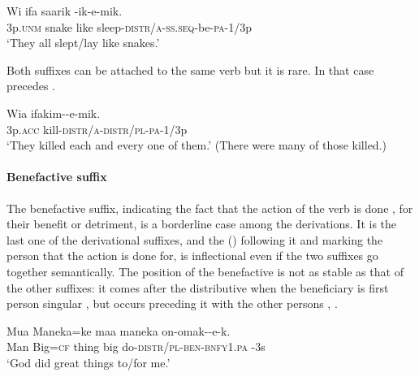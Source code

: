 \ea%
\label{ex:3:x208}
\gll Wi ifa saarik -ik-e-mik. \\
3p.\textsc{unm} snake like sleep-\textsc{distr}/\textsc{a}-\textsc{ss}.\textsc{seq}-be-\textsc{pa}-1/3p \\
\glt`They all slept/lay like snakes.'
\z

Both suffixes can be attached to the same verb but it is rare. In that case \textstyleEmphasizedVernacularWords{\nobreakdash-} precedes \textstyleEmphasizedVernacularWords{\nobreakdash-}.

\ea%
\label{ex:3:x206}
\gll Wia ifakim--e-mik. \\
3p.\textsc{acc} kill-\textsc{distr}/\textsc{a}-\textsc{distr}/\textsc{pl}-\textsc{pa}-1/3p \\
\glt`They killed each and every one of them.' (There were many of those killed.) 
\z

\paragraph{Benefactive suffix} \label{sec:3.8.2.3.3}
{}
The benefactive suffix, indicating the fact that the action of the verb is done , for their benefit or detriment, is a borderline case among the derivations. It is the last one of the derivational suffixes, and the  () following it and marking the person that the action is done for, is inflectional even if the two suffixes go together semantically. The position of the benefactive is not as stable as that of the other suffixes: it comes after the distributive when the beneficiary is first person singular ,  but occurs preceding it with the other persons , . 

\ea%
\label{ex:3:x210}
\gll Mua Maneka=ke maa maneka on-omak--e-k. \\
Man Big=\textsc{cf} thing big do-\textsc{distr}/\textsc{pl}-\textsc{ben}-\textsc{bnfy}1.\textsc{pa}{\footnotemark} -3s \\
\glt`God did great things to/for me.'
\z
{}

